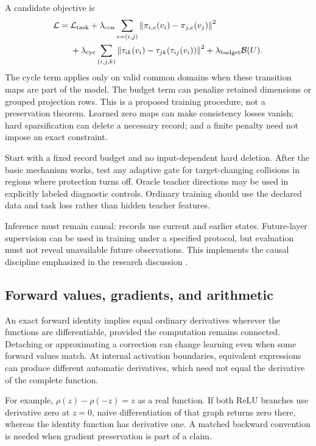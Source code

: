 A candidate objective is
\begin{align}
 \mathcal L={}&\mathcal L_{\rm task}
 +\lambda_{\rm con}\sum_{e=(i,j)}
   \left\lVert\pi_{i,e}(v_i)-\pi_{j,e}(v_j)\right\rVert^2 \nonumber\\
 &+\lambda_{\rm cyc}\sum_{(i,j,k)}
   \left\lVert\tau_{ik}(v_i)-\tau_{jk}(\tau_{ij}(v_i))\right\rVert^2
 +\lambda_{\rm budget}\mathcal B(U).
 \label{eq:training}
\end{align}
The cycle term applies only on valid common domains when these transition
maps are part of the model. The budget term can penalize retained dimensions
or grouped projection rows. This is a proposed training procedure, not a
preservation theorem. Learned zero maps can make consistency losses vanish;
hard sparsification can delete a necessary record; and a finite penalty need
not impose an exact constraint.

Start with a fixed record budget and no input-dependent hard deletion.
After the basic mechanism works, test any adaptive gate for target-changing
collisions in regions where protection turns off. Oracle teacher directions
may be used in explicitly labeled diagnostic controls. Ordinary training
should use the declared data and task loss rather than hidden teacher
features.

Inference must remain causal: records use current and earlier states.
Future-layer supervision can be used in training under a specified protocol,
but evaluation must not reveal unavailable future observations. This
implements the causal discipline emphasized in the research discussion
\cite{discussion}.

\subsection{Forward values, gradients, and arithmetic}

An exact forward identity implies equal ordinary derivatives wherever the
functions are differentiable, provided the computation remains connected.
Detaching or approximating a correction can change learning even when some
forward values match. At internal activation boundaries, equivalent expressions
can produce different automatic derivatives, which need not equal the
derivative of the complete function.

For example, \(\rho(z)-\rho(-z)=z\) as a real function. If both ReLU branches
use derivative zero at \(z=0\), naive differentiation of that graph returns
zero there, whereas the identity function has derivative one. A matched
backward convention is needed when gradient preservation is part of a claim.

